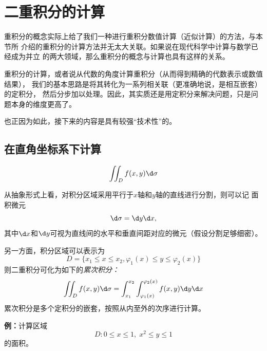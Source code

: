 \section{二重积分的计算}


重积分的概念实际上给了我们一种进行重积分数值计算（近似计算）的方法，与本节所
介绍的重积分的计算方法并无太大关联。如果说在现代科学中计算与数学已经成为并立
的两大领域，那么重积分的概念与计算也具有这样的关系。

重积分的计算，或者说从代数的角度计算重积分（从而得到精确的代数表示或数值结果），
我们的基本思路是将其转化为一系列相关联（更准确地说，是相互嵌套）的定积分，
然后分步加以处理。因此，其实质还是用定积分来解决问题，只是问题本身的维度更高了。

也正因为如此，接下来的内容是具有较强“技术性”的。

\subsection{在直角坐标系下计算}

$$\iint_Df(x,y)\d\sigma
$$

从抽象形式上看，对积分区域采用平行于$x$轴和$y$轴的直线进行分割，则可以记
面积微元
$$\d\sigma=\d y\d x,$$
其中$\d x$和$\d y$可视为直线间的水平和垂直间距对应的微元（假设分割足够细密）。

另一方面，积分区域可以表示为
$$D=\{x_1\leq x\leq x_2,\varphi_1(x)\leq y\leq \varphi_2(x)\}$$
则二重积分可化为如下的{\it 累次积分：}
$${\iint_Df(x,y)\d\sigma=\int_{x_1}^{x_2}
\int_{\varphi_1(x)}^{\varphi_2(x)}f(x,y)\d y\d x}$$
累次积分是多个定积分的嵌套，按照从内至外的次序进行计算。

{\bf 例：}计算区域
$$D:0\leq x\leq 1,\;x^2\leq y\leq 1$$
的面积。

